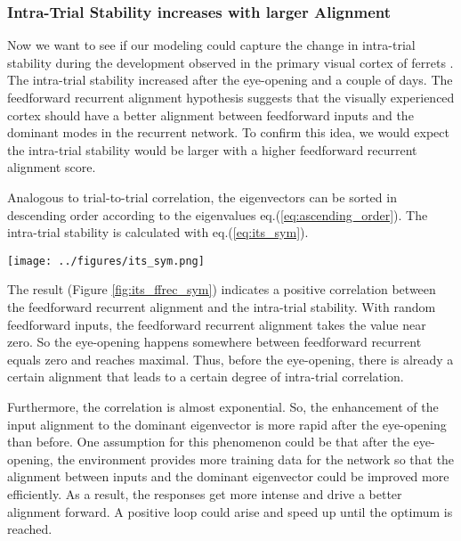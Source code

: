 \documentclass[11pt]{article}
\begin{document}
	\subsubsection{Intra-Trial Stability increases with larger Alignment}
	
	Now we want to see if our modeling could capture the change in intra-trial stability during the development observed in the primary visual cortex of ferrets \cite{tragenap2023nature}. The intra-trial stability increased after the eye-opening and a couple of days. The feedforward recurrent alignment hypothesis suggests that the visually experienced cortex should have a better alignment between feedforward inputs and the dominant modes in the recurrent network. To confirm this idea, we would expect the intra-trial stability would be larger with a higher feedforward recurrent alignment score. 
	
	Analogous to trial-to-trial correlation, the eigenvectors can be sorted in descending order according to the eigenvalues eq.(\ref{eq:ascending_order}). The intra-trial stability is calculated with eq.(\ref{eq:its_sym}).

	\begin{SCfigure}[0.9][h] 
		\centering
		\caption[Correlation between feedforward recurrent alignment and intra-trial stability for symmetric RNNs]{\textbf{Correlation between feedforward recurrent alignment and intra-trial stability for symmetric RNNs.} Inputs aligned to eigenvectors $e_i$ of interaction matrix $J$ sorted according to the ascending order of eigenvalues eq.(\ref{eq:ascending_order}), resulting the feedforward recurrent alignment varies approximately between $\lambda_{\text{min}}$ and $\lambda_{\text{max}}$. For one input aligned to an eigenvector, the intra-trial stability is calculated with the evoked steady-state response eq.(\ref{eq:its_sym}).}
		\texttt{[image: ../figures/its\_sym.png]}
		\label{fig:its_ffrec_sym}
	\end{SCfigure}

	The result (Figure \ref{fig:its_ffrec_sym}) indicates a positive correlation between the feedforward recurrent alignment and the intra-trial stability. With random feedforward inputs, the feedforward recurrent alignment takes the value near zero. So the eye-opening happens somewhere between feedforward recurrent equals zero and reaches maximal. Thus, before the eye-opening, there is already a certain alignment that leads to a certain degree of intra-trial correlation. 
	
	Furthermore, the correlation is almost exponential. So, the enhancement of the input alignment to the dominant eigenvector is more rapid after the eye-opening than before. One assumption for this phenomenon could be that after the eye-opening, the environment provides more training data for the network so that the alignment between inputs and the dominant eigenvector could be improved more efficiently. As a result, the responses get more intense and drive a better alignment forward. A positive loop could arise and speed up until the optimum is reached. 
	
\end{document}
